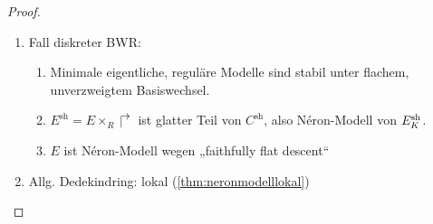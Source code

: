 \documentclass[german]{scrreprt}
\begin{document}
\begin{Satz}
\begin{proof}
\begin{enumerate}
\begin{enumerate}
      \end{enumerate}
    \item Fall diskreter BWR:
      \begin{enumerate}
      \item Minimale eigentliche, reguläre Modelle sind stabil unter
        flachem, unverzweigtem Basiswechsel.
      \item $E^\text{sh}=E\times_R\Rsh$ ist glatter Teil von
        $C^\text{sh}$, also Néron-Modell von $E_{K}^\text{sh}$.
      \item $E$ ist Néron-Modell wegen „faithfully flat descent“
      \end{enumerate}
    \item Allg. Dedekindring: lokal (\autoref{thm:neronmodelllokal})
    \end{enumerate}
  \end{proof}
\end{Satz}
\end{document}
